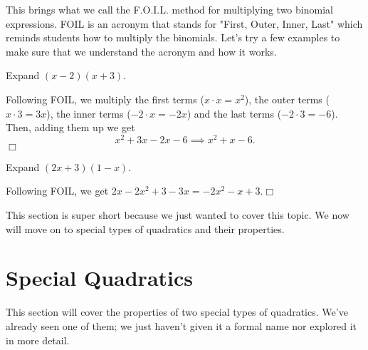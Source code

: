 \documentclass[../book.tex]{subfiles}
\begin{document}
This brings what we call the F.O.I.L.  method for multiplying two binomial expressions.  FOIL is an acronym that stands for "First, Outer, Inner, Last" which reminds students how to multiply the binomials.  Let's try a few examples to make sure that we understand the acronym and how it works.
\begin{example}
Expand $(x-2)(x+3)$.
\end{example}
\begin{solution}
Following FOIL, we multiply the first terms ($x\cdot x=x^2$), the outer terms ($x\cdot 3=3x$), the inner terms ($-2\cdot x=-2x$) and the last terms ($-2 \cdot 3=-6$).  Then, adding them up we get $$x^2+3x-2x-6 \implies x^2+x-6.$$ $\Box$
\end{solution}
\begin{example}
Expand $(2x+3)(1-x)$.
\end{example}
\begin{solution}
Following FOIL, we get $2x-2x^2+3-3x=-2x^2-x+3$.$\Box$
\end{solution}
\noindent This section is super short because we just wanted to cover this topic.  We now will move on to special types of quadratics and their properties.
\section{Special Quadratics}
\noindent This section will cover the properties of two special types of quadratics.  We've already seen one of them; we just haven't given it a formal name nor explored it in more detail.
\end{document}
